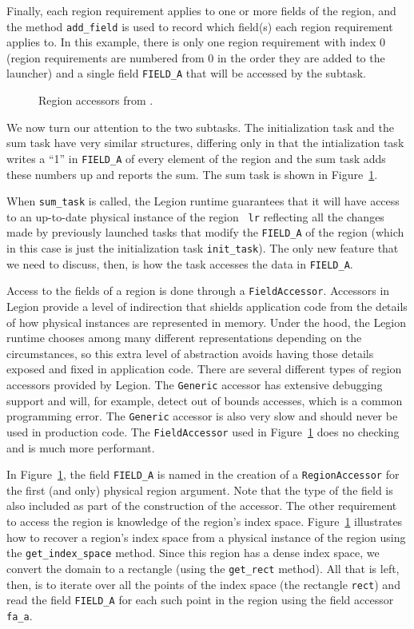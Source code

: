Finally, each region requirement applies to one or more fields of the region, and the method {\tt add\_field} is
used to record which field(s) each region requirement applies to.
In this example, there is only one region requirement with index 0 (region requirements
are numbered from 0 in the order they are added to the launcher) and a single field {\tt FIELD\_A} that will be
accessed by the subtask.

\begin{figure}
  {\small
  }
\caption{Region accessors from .}
\label{fig:accessors}
\end{figure}
We now turn our attention to the two subtasks.  The initialization task and the sum task have very similar
structures, differing only in that the intialization task writes a ``1'' in {\tt FIELD\_A} of every element of the region and
the sum task adds these numbers up and reports the sum.  The sum task is shown in Figure~\ref{fig:accessors}.

When {\tt sum\_task} is called, the Legion runtime guarantees that it
will have access to an up-to-date physical instance of the region {\tt
  lr} reflecting all the changes made by previously launched tasks
that modify the {\tt FIELD\_A} of the region (which in this case is
just the initialization task {\tt init\_task}).  The only new feature
that we need to discuss, then, is how the task accesses the data in {\tt FIELD\_A}.

Access to the fields of a region is done through a {\tt FieldAccessor}.  Accessors in Legion provide a level of indirection
that shields application code from the details of how physical instances  are represented in memory.  Under the hood, 
the Legion runtime chooses among many different representations depending on the circumstances, so this extra level
of abstraction avoids having those details exposed and fixed in application code.  There are several different types of
region accessors provided by Legion.  The {\tt Generic} accessor has 
extensive debugging support and will, for example, detect out of bounds accesses, which is a common programming error.  The {\tt Generic} accessor is also very slow and should never be used in production code.  
The {\tt FieldAccessor} used in Figure~\ref{fig:accessors} does no checking and is much more performant.

In Figure~\ref{fig:accessors}, the field
{\tt FIELD\_A} is named in the creation of a {\tt RegionAccessor} for the first (and only) physical region argument.
Note that the type of the field is also included as part of the construction of the accessor.
The other requirement to access the region is knowledge of the region's index space.  Figure~\ref{fig:accessors}
illustrates how to recover a region's index space from a physical instance of the region using the {\tt get\_index\_space} method.
Since this region has a dense index space, we convert the domain to a rectangle (using the {\tt get\_rect} method).
All that is left, then, is to iterate over all the points of the index space (the rectangle {\tt rect}) and read the
field {\tt FIELD\_A} for each such point in the region using the field accessor {\tt fa\_a}.

